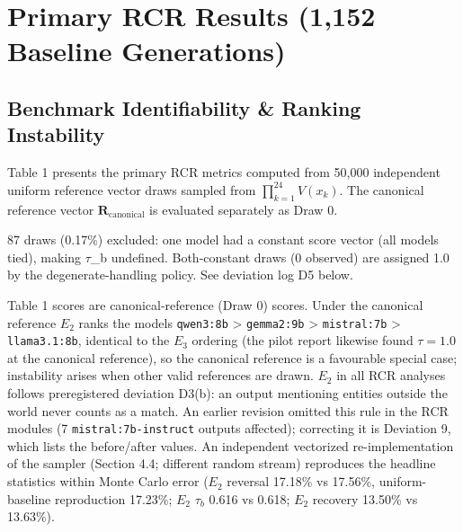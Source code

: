 \documentclass[11pt]{article}
\begin{document}
\section{Primary RCR Results (1,152 Baseline Generations)}
\subsection{Benchmark Identifiability \& Ranking Instability}
Table 1 presents the primary RCR metrics computed from 50,000 independent uniform reference vector draws sampled from $\prod_{k=1}^{24} V(x_k)$. The canonical reference vector $\mathbf{R}_{\text{canonical}}$ is evaluated separately as Draw 0.

\begin{table}[htbp]
\centering
\scriptsize
\setlength{\tabcolsep}{3pt}
\caption{Primary Reference-Choice Robustness Metrics (50,000 Monte Carlo Draws)}
\end{table}
{\footnotesize \textdagger{}87 draws (0.17\%) excluded: one model had a constant score vector (all models tied), making $\tau$\_b undefined. Both-constant draws (0 observed) are assigned 1.0 by the degenerate-handling policy. See deviation log D5 below.}

Table 1 scores are canonical-reference (Draw 0) scores. Under the canonical reference $E_2$ ranks the models \texttt{qwen3:8b} > \texttt{gemma2:9b} > \texttt{mistral:7b} > \texttt{llama3.1:8b}, identical to the $E_3$ ordering (the pilot report likewise found $\tau = 1.0$ at the canonical reference), so the canonical reference is a favourable special case; instability arises when other valid references are drawn. $E_2$ in all RCR analyses follows preregistered deviation D3(b): an output mentioning entities outside the world never counts as a match. An earlier revision omitted this rule in the RCR modules (7 \texttt{mistral:7b-instruct} outputs affected); correcting it is Deviation 9, which lists the before/after values. An independent vectorized re-implementation of the sampler (Section 4.4; different random stream) reproduces the headline statistics within Monte Carlo error ($E_2$ reversal 17.18\% vs 17.56\%, uniform-baseline reproduction 17.23\%; $E_2$ $\tau_b$ 0.616 vs 0.618; $E_2$ recovery 13.50\% vs 13.63\%).
\end{document}
